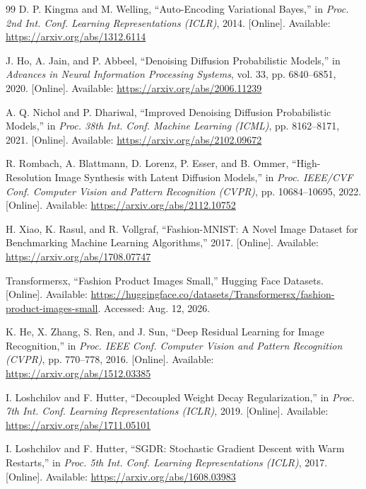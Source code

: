 \documentclass{article}
\begin{document}
\clearpage
\begin{thebibliography}{99}
 D. P. Kingma and M. Welling, ``Auto-Encoding Variational Bayes,'' in \emph{Proc. 2nd Int. Conf. Learning Representations (ICLR)}, 2014. [Online]. Available: \url{https://arxiv.org/abs/1312.6114}

 J. Ho, A. Jain, and P. Abbeel, ``Denoising Diffusion Probabilistic Models,'' in \emph{Advances in Neural Information Processing Systems}, vol. 33, pp. 6840--6851, 2020. [Online]. Available: \url{https://arxiv.org/abs/2006.11239}

 A. Q. Nichol and P. Dhariwal, ``Improved Denoising Diffusion Probabilistic Models,'' in \emph{Proc. 38th Int. Conf. Machine Learning (ICML)}, pp. 8162--8171, 2021. [Online]. Available: \url{https://arxiv.org/abs/2102.09672}

 R. Rombach, A. Blattmann, D. Lorenz, P. Esser, and B. Ommer, ``High-Resolution Image Synthesis with Latent Diffusion Models,'' in \emph{Proc. IEEE/CVF Conf. Computer Vision and Pattern Recognition (CVPR)}, pp. 10684--10695, 2022. [Online]. Available: \url{https://arxiv.org/abs/2112.10752}

 H. Xiao, K. Rasul, and R. Vollgraf, ``Fashion-MNIST: A Novel Image Dataset for Benchmarking Machine Learning Algorithms,'' 2017. [Online]. Available: \url{https://arxiv.org/abs/1708.07747}

 Transformersx, ``Fashion Product Images Small,'' Hugging Face Datasets. [Online]. Available: \url{https://huggingface.co/datasets/Transformersx/fashion-product-images-small}. Accessed: Aug. 12, 2026.

 K. He, X. Zhang, S. Ren, and J. Sun, ``Deep Residual Learning for Image Recognition,'' in \emph{Proc. IEEE Conf. Computer Vision and Pattern Recognition (CVPR)}, pp. 770--778, 2016. [Online]. Available: \url{https://arxiv.org/abs/1512.03385}

 I. Loshchilov and F. Hutter, ``Decoupled Weight Decay Regularization,'' in \emph{Proc. 7th Int. Conf. Learning Representations (ICLR)}, 2019. [Online]. Available: \url{https://arxiv.org/abs/1711.05101}

 I. Loshchilov and F. Hutter, ``SGDR: Stochastic Gradient Descent with Warm Restarts,'' in \emph{Proc. 5th Int. Conf. Learning Representations (ICLR)}, 2017. [Online]. Available: \url{https://arxiv.org/abs/1608.03983}


\end{thebibliography}
\end{document}

